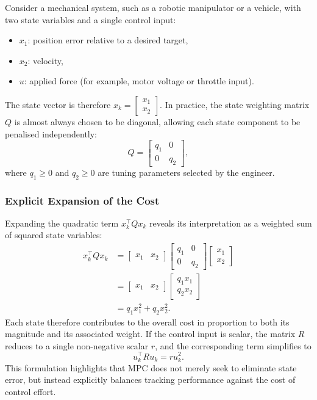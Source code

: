 Consider a mechanical system, such as a robotic manipulator or a vehicle, with two state variables and a single control input:
\begin{itemize}
	\item $x_1$: position error relative to a desired target,
	\item $x_2$: velocity,
	\item $u$: applied force (for example, motor voltage or throttle input).
\end{itemize}
The state vector is therefore $x_k = \begin{bmatrix} x_1 \\ x_2 \end{bmatrix}$. In practice, the state weighting matrix $Q$ is almost always chosen to be diagonal, allowing each state component to be penalised independently:
\begin{equation}
	Q = \begin{bmatrix} q_1 & 0 \\ 0 & q_2 \end{bmatrix} ,
\end{equation}
where $q_1 \ge 0$ and $q_2 \ge 0$ are tuning parameters selected by the engineer.

\subsubsection*{Explicit Expansion of the Cost}
Expanding the quadratic term $x_k^\top  Q x_k$ reveals its interpretation as a weighted sum of squared state variables:
\begin{equation}
	\begin{aligned}
		x_k^\top  Q x_k 
		&= \begin{bmatrix} x_1 & x_2 \end{bmatrix}
		\begin{bmatrix} q_1 & 0 \\ 0 & q_2 \end{bmatrix}
		\begin{bmatrix} x_1 \\ x_2 \end{bmatrix} \\
		&= \begin{bmatrix} x_1 & x_2 \end{bmatrix}
		\begin{bmatrix} q_1 x_1 \\ q_2 x_2 \end{bmatrix} \\
		&= q_1 x_1^2 + q_2 x_2^2 .
	\end{aligned}
\end{equation}
Each state therefore contributes to the overall cost in proportion to both its magnitude and its associated weight. If the control input is scalar, the matrix $R$ reduces to a single non-negative scalar $r$, and the corresponding term simplifies to
\begin{equation}
	u_k^\top  R u_k = r u_k^2 .
\end{equation}
This formulation highlights that MPC does not merely seek to eliminate state error, but instead explicitly balances tracking performance against the cost of control effort.


